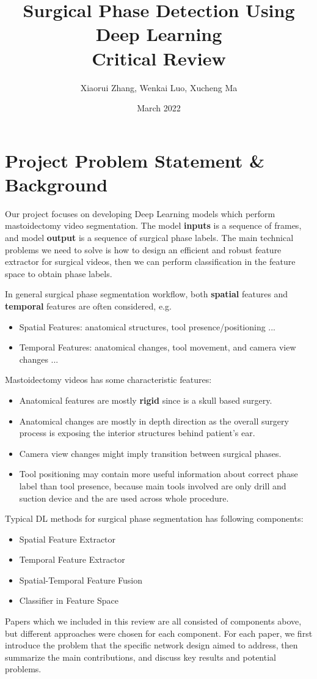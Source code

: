 \documentclass[11pt]{article} \usepackage[top=1in, bottom=1in, left=1in, right=1in]{geometry}
\title{Surgical Phase Detection Using Deep Learning\\ Critical Review}
\author{Xiaorui Zhang, Wenkai Luo, Xucheng Ma}
\date{March 2022}
\begin{document}
\maketitle
\section{Project Problem Statement \& Background}
Our project focuses on developing Deep Learning models which perform mastoidectomy video segmentation. The model \textbf{inputs} is a sequence of frames, and model \textbf{output} is a sequence of surgical phase labels. The main technical problems we need to solve is how to design an efficient and robust feature extractor for surgical videos, then we can perform classification in the feature space to obtain phase labels.

\vspace{0.25cm}
\noindent
In general surgical phase segmentation workflow, both \textbf{spatial} features and \textbf{temporal} features are often considered, e.g.
\begin{itemize}
  \item Spatial Features: anatomical structures, tool presence/positioning ...
  \item Temporal Features: anatomical changes, tool movement, and camera view changes ...
\end{itemize}
Mastoidectomy videos has some characteristic features:
\begin{itemize}
  \item Anatomical features are mostly \textbf{rigid} since is a skull based surgery.
  \item Anatomical changes are mostly in depth direction as the overall surgery process is exposing the interior structures behind patient's ear.
  \item Camera view changes might imply transition between surgical phases.
  \item Tool positioning may contain more useful information about correct phase label than tool presence, because main tools involved are only drill and suction device and the are used across whole procedure.
\end{itemize}

\vspace{0.25cm}
\noindent
Typical DL methods for surgical phase segmentation has following components:
\begin{itemize}
  \item Spatial Feature Extractor
  \item Temporal Feature Extractor
  \item Spatial-Temporal Feature Fusion
  \item Classifier in Feature Space
\end{itemize}
Papers which we included in this review are all consisted of components above, but different approaches were chosen for each component. For each paper, we first introduce the problem that the specific network design aimed to address, then summarize the main contributions, and discuss key results and potential problems.
\end{document}
